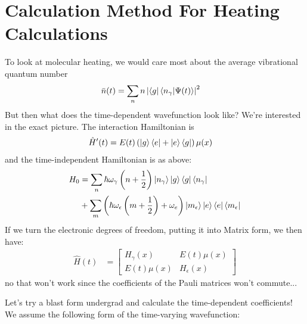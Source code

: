 \section{Calculation Method For Heating Calculations}
To look at molecular heating, we would care most about the average vibrational quantum number
\begin{align*}
	\bar{n}(t) &= \sum_{n} n \left| \bra{g}\braket{n_{\gamma} | \Psi(t)} \right|^2
\end{align*}
But then what does the time-dependent wavefunction look like?  We're interested in the exact picture.  The interaction Hamiltonian is
\begin{align*}
	\hat{H}'(t) &= E(t)  \left(\ket{g}\bra{e} + \ket{e}\bra{g}\right)\mu(x)
\end{align*}
and the time-independent Hamiltonian is as above:
\begin{align}
	H_0 &=  \sum_n \hbar \omega_{\gamma}  \left(n + \frac{1}{2} \right)  \ket{n_{\gamma}}\ket{g}\bra{g} \bra{n_{\gamma}} \\
   &+ \sum_m \left(  \hbar \omega_{\epsilon}  \left(m + \frac{1}{2} \right) + \omega_e \right)  \ket{m_{\epsilon}} \ket{e}\bra{e} \bra{m_{\epsilon}}
\end{align}
If we turn the electronic degrees of freedom, putting it into Matrix form, we then have:
\begin{align*}
	\hat{H}(t) &=
	\begin{bmatrix}
	H_{\gamma}(x) & E(t)\mu(x) \\
	E(t)\mu(x) & H_{\epsilon}(x)
	\end{bmatrix}
\end{align*}
no that won't work since the coefficients of the Pauli matrices won't commute...

Let's try a blast form undergrad and calculate the time-dependent coefficients!  We assume the following form of the time-varying wavefunction:

